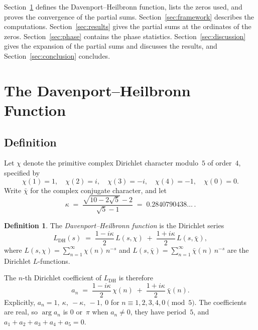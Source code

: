 \documentclass[11pt]{amsart}
\theoremstyle{definition}
\newtheorem{definition}[theorem]{Definition}
\theoremstyle{remark}
\renewcommand{\DH}{\mathrm{DH}}
\begin{document}
Section~\ref{sec:DH} defines the Davenport--Heilbronn function, lists the
zeros used, and proves the convergence of the partial sums.
Section~\ref{sec:framework} describes the computations.
Section~\ref{sec:results} gives the partial sums at the ordinates of the
zeros.  Section~\ref{sec:phase} contains the phase statistics.
Section~\ref{sec:discussion} gives the expansion of the partial sums and
discusses the results, and Section~\ref{sec:conclusion} concludes.

\section{The Davenport--Heilbronn Function}\label{sec:DH}

\subsection{Definition}

Let $\chi$ denote the primitive complex Dirichlet character
modulo~$5$ of order~$4$, specified by
\begin{equation}\label{eq:chi-values}
  \chi(1) = 1, \quad
  \chi(2) = i, \quad
  \chi(3) = -i, \quad
  \chi(4) = -1, \quad
  \chi(0) = 0.
\end{equation}
Write $\bar\chi$ for the complex conjugate character, and let
\begin{equation}\label{eq:kappa}
  \kappa \;=\; \frac{\sqrt{10-2\sqrt{5}}-2}{\sqrt{5}-1}
  \;=\; 0.2840790438\ldots\,.
\end{equation}

\begin{definition}\label{def:DH}
The \emph{Davenport--Heilbronn function} is the Dirichlet series
\begin{equation}\label{eq:LDH}
  L_{\DH}(s) \;=\;
  \frac{1-i\kappa}{2}\, L(s,\chi)
  \;+\;
  \frac{1+i\kappa}{2}\, L(s,\bar\chi),
\end{equation}
where $L(s,\chi) = \sum_{n=1}^{\infty} \chi(n)\, n^{-s}$ and
$L(s,\bar\chi) = \sum_{n=1}^{\infty} \bar\chi(n)\, n^{-s}$ are the
Dirichlet $L$-functions.
\end{definition}

The $n$-th Dirichlet coefficient of $L_{\DH}$ is therefore
\begin{equation}\label{eq:DH-coeff}
  a_n \;=\; \frac{1-i\kappa}{2}\,\chi(n)
  \;+\; \frac{1+i\kappa}{2}\,\bar\chi(n).
\end{equation}
Explicitly, $a_n=1,\ \kappa,\ -\kappa,\ -1,\ 0$ for
$n\equiv1,2,3,4,0\pmod 5$.  The coefficients are real, so $\arg a_n$ is
$0$ or~$\pi$ when $a_n\ne0$, they have period~$5$, and
$a_1+a_2+a_3+a_4+a_5=0$.
\end{document}
